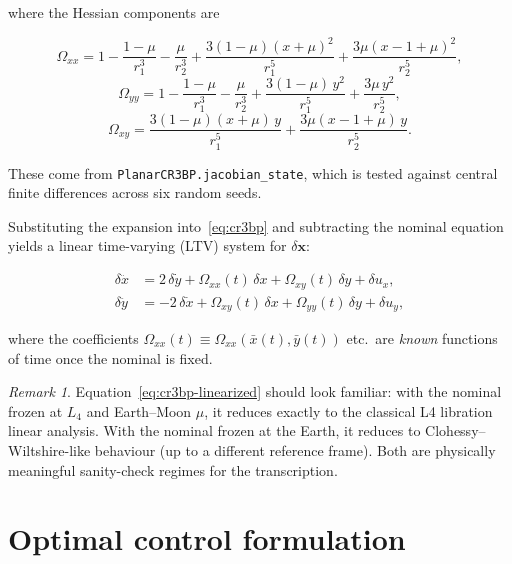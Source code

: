 \documentclass[8pt,a4paper]{article}
\newcommand{\bvec}[1]{\bm{#1}}
\newcommand{\xvec}{\bvec{x}}
\newcommand{\Omegaxx}{\Omega_{xx}}
\newcommand{\Omegayy}{\Omega_{yy}}
\newcommand{\Omegaxy}{\Omega_{xy}}
\theoremstyle{definition}
\theoremstyle{remark}
\newtheorem*{remark}{Remark}
\begin{document}
where the Hessian components are

\begin{equation}
  \Omegaxx = 1 - \frac{1-\mu}{r_1^3} - \frac{\mu}{r_2^3}
       + \frac{3(1-\mu)(x+\mu)^2}{r_1^5}
       + \frac{3\mu(x - 1 + \mu)^2}{r_2^5},
\label{eq:omega-xx}
\end{equation}
\begin{equation}
  \Omegayy = 1 - \frac{1-\mu}{r_1^3} - \frac{\mu}{r_2^3}
       + \frac{3(1-\mu)\,y^2}{r_1^5} + \frac{3\mu\,y^2}{r_2^5},
\label{eq:omega-yy}
\end{equation}
\begin{equation}
  \Omegaxy = \frac{3(1-\mu)(x+\mu)\,y}{r_1^5}
       + \frac{3\mu(x - 1 + \mu)\,y}{r_2^5}.
\label{eq:omega-xy}
\end{equation}

These come from \texttt{PlanarCR3BP.jacobian\_state}, which is tested
against central finite differences across six random seeds.

Substituting the expansion into~\eqref{eq:cr3bp} and subtracting the
nominal equation yields a linear time-varying (LTV) system for
$\delta\xvec$:

\begin{equation}
  \boxed{
  \begin{aligned}
    \delta\ddot{x} &=  2\,\delta\dot{y}
       + \Omegaxx(t)\,\delta x + \Omegaxy(t)\,\delta y + \delta u_x, \\
    \delta\ddot{y} &= -2\,\delta\dot{x}
       + \Omegaxy(t)\,\delta x + \Omegayy(t)\,\delta y + \delta u_y,
  \end{aligned}
  }
  \label{eq:cr3bp-linearized}
\end{equation}

where the coefficients $\Omegaxx(t) \equiv \Omegaxx(\bar x(t),
\bar y(t))$ etc.\ are \emph{known} functions of time once the
nominal is fixed.

\begin{remark}
Equation~\eqref{eq:cr3bp-linearized} should look familiar: with the
nominal frozen at $L_4$ and Earth--Moon $\mu$, it reduces exactly to
the classical L4 libration linear analysis. With the nominal frozen
at the Earth, it reduces to Clohessy--Wiltshire-like behaviour (up to
a different reference frame). Both are physically meaningful
sanity-check regimes for the transcription.
\end{remark}


\section{Optimal control formulation}
\end{document}
